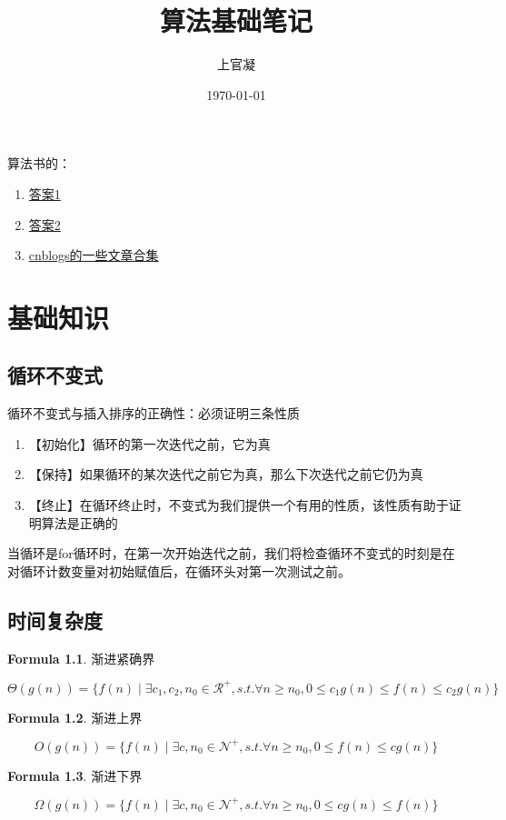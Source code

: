 \documentclass[]{report}
\title{{\huge {算法基础笔记}}}
\author{上官凝}
\date{\today}
\begin{document}
\theoremstyle{definition} \newtheorem{theorem}{Thm}[section] %
\theoremstyle{definition} \newtheorem{definition}{Def}[section] %
\theoremstyle{definition} \newtheorem{formula}{Formula}[section] %
\theoremstyle{plain} \newtheorem{lemma}{lemma}[section] %

	\maketitle
	\newpage

	\tableofcontents
	\newpage

	算法书的：
	\begin{enumerate}
		\item \href{https://ita.skanev.com/08/03/02.html}{答案1}
		\item \href{https://sites.math.rutgers.edu/~ajl213/CLRS/CLRS.html}{答案2}
		\item \href{https://www.cnblogs.com/alantu2018/category/1163289.html}{cnblogs的一些文章合集}
	\end{enumerate}
	\chapter{基础知识}
	\section{循环不变式}
		循环不变式与插入排序的正确性：必须证明三条性质
		\begin{enumerate}
			\item 【初始化】循环的第一次迭代之前，它为真
			\item 【保持】如果循环的某次迭代之前它为真，那么下次迭代之前它仍为真
			\item 【终止】在循环终止时，不变式为我们提供一个有用的性质，该性质有助于证明算法是正确的
		\end{enumerate}\par
		当循环是for循环时，在第一次开始迭代之前，我们将检查循环不变式的时刻是在对循环计数变量对初始赋值后，在循环头对第一次测试之前。
	\section{时间复杂度}
		\begin{formula} 渐进紧确界\par
		\[\Theta(g(n))=\{f(n)\mid\exists c_1,c_2,n_0\in\mathcal{R}^+,s.t.\forall n\ge n_0,0\le c_1g(n)\le f(n)\le c_2g(n)\}\]
		\end{formula}
		\begin{formula}
			渐进上界\par
			\[O(g(n))=\{f(n)\mid\exists c,n_0\in\mathcal{N}^+,s.t.\forall n\ge n_0,0\le f(n)\le cg(n)\}\]
		\end{formula}
		\begin{formula}
			渐进下界\par
			\[\Omega(g(n))=\{f(n)\mid\exists c,n_0\in\mathcal{N}^+,s.t.\forall n\ge n_0,0\le cg(n)\le f(n)\}\]
		\end{formula}
\end{document}
